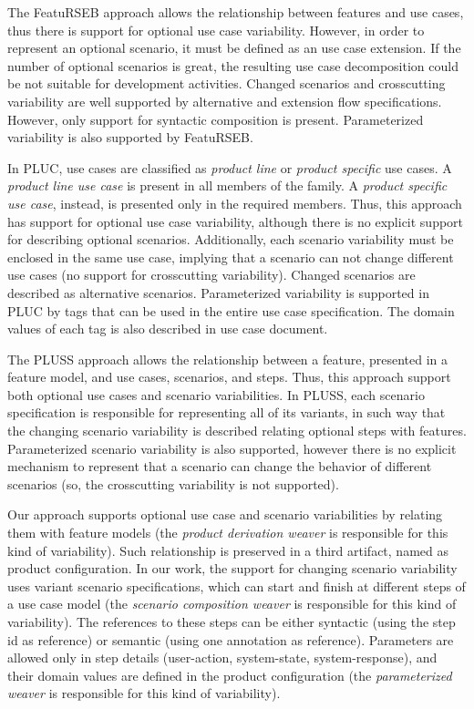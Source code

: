 The FeatuRSEB approach allows the relationship between features
and use cases, thus there is support for optional use case
variability. However, in order to represent an optional scenario, it
must be defined as an use case extension. If the number of optional
scenarios is great, the resulting use case decomposition could be
not suitable for development activities. Changed scenarios and
crosscutting variability are well supported by alternative and
extension flow specifications. However, only support for syntactic
composition is present. Parameterized variability is also supported
by FeatuRSEB.

In PLUC, use cases are classified as \emph{product line} or
\emph{product specific} use cases. A \emph{product line use case} is
present in all members of the family. A \emph{product specific use
case}, instead, is presented only in the required members. Thus, this approach 
has support for optional use case variability, although 
there is no explicit support for describing optional scenarios. Additionally, each scenario 
variability must be enclosed in the same
use case, implying that a scenario can not change different use
cases (no support for crosscutting variability). Changed scenarios
are described as alternative scenarios. Parameterized variability is
supported in PLUC by tags that can be used in the entire use case
specification. The domain values of each tag is also described in
use case document.

The PLUSS approach allows the relationship between a feature,
presented in a feature model, and use cases, scenarios, and steps.
Thus, this approach support both optional use cases and scenario
variabilities. In PLUSS, each scenario specification is responsible
for representing all of its variants, in such way that the changing
scenario variability is described relating optional steps with
features. Parameterized scenario variability is also supported,
however there is no explicit mechanism to represent that a scenario
can change the behavior of different scenarios (so, the
crosscutting variability is not supported).

Our approach supports optional use case and scenario
variabilities by relating them with feature models (the \emph{product derivation 
weaver} is responsible for this kind of variability). Such
relationship is preserved in a third artifact, named as product
configuration. In our work, the support for changing scenario
variability uses variant scenario specifications, which can
start and finish at different steps of a use case model (the \emph{scenario 
composition weaver} is responsible for this kind of variability). The
references to these steps can be either syntactic (using the step id
as reference) or semantic (using one annotation as reference).
Parameters are allowed only in step details (user-action,
system-state, system-response), and their domain
values are defined in the product configuration (the \emph{parameterized weaver} is 
responsible for this kind of variability).

